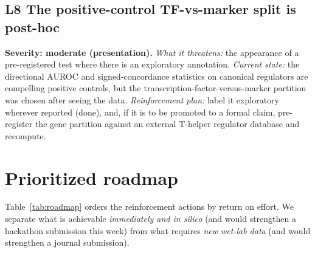 \documentclass[11pt]{article}
\newcommand{\sev}[2]{\textcolor{#1}{\textbf{#2}}}
\begin{document}
\subsection{L8 \quad The positive-control TF-vs-marker split is post-hoc}
\sev{sev3}{Severity: moderate (presentation).}
\emph{What it threatens:} the appearance of a pre-registered test where there is an exploratory
annotation.
\emph{Current state:} the directional AUROC and signed-concordance statistics on canonical
regulators are compelling positive controls, but the transcription-factor-versus-marker
partition was chosen after seeing the data.
\emph{Reinforcement plan:} label it exploratory wherever reported (done), and, if it is to be
promoted to a formal claim, pre-register the gene partition against an external T-helper
regulator database and recompute.

\section{Prioritized roadmap}

Table~\ref{tab:roadmap} orders the reinforcement actions by return on effort. We separate what
is achievable \emph{immediately and in silico} (and would strengthen a hackathon submission this
week) from what requires \emph{new wet-lab data} (and would strengthen a journal submission).
\end{document}

